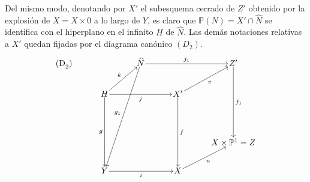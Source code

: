 Del mismo modo, denotando por $X'$ el subesquema cerrado de $Z'$ obtenido por la explosión de $X=X\times0$ a lo largo de $Y$, es claro que $\mathbb P(N)=X'\cap\widehat N$ se identifica con el hiperplano en el infinito $H$ de $\widehat N$. Las demás notaciones relativas a $X'$ quedan fijadas por el diagrama canónico $(D_2)$.
\[
\begin{tikzcd}[column sep=3.2em,row sep=2.4em,cells={nodes={inner sep=1pt}}]
\text{(D}_2\text{)}\arrow[from=1-3,to=5-2,"g_1"']
& & \widehat N \arrow[rr,"j_1"] & & Z' \arrow[ddd,"f_1"] \\
& H \arrow[ur,"k"] \arrow[rr,"j"'] \arrow[ddd,"g"'] & &
X' \arrow[ur,"v"'] \arrow[ddd,"f"] & \\
& & & & \\
& & & & X\times\mathbb P^1=Z \\
& Y \arrow[rr,"i"'] & & X \arrow[ur,"u"'] &
\end{tikzcd}
\]
